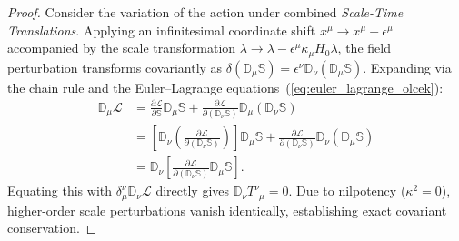 \documentclass[11pt,a4paper]{article}
\begin{document}
\begin{proof}
    Consider the variation of the action under combined \textit{Scale-Time Translations}. Applying an infinitesimal coordinate shift $x^\mu \to x^\mu + \epsilon^\mu$ accompanied by the scale transformation $\lambda \to \lambda - \epsilon^\mu \kappa_\mu H_0 \lambda$, the field perturbation transforms covariantly as $\delta (\mathbb{D}_\mu \mathbb{S}) = \epsilon^\nu \mathbb{D}_\nu (\mathbb{D}_\mu \mathbb{S})$. Expanding via the chain rule and the Euler--Lagrange equations~(\ref{eq:euler_lagrange_olcek}):
    \begin{align*}
        \mathbb{D}_\mu \mathcal{L} & = \frac{\partial \mathcal{L}}{\partial \mathbb{S}} \mathbb{D}_\mu \mathbb{S} + \frac{\partial \mathcal{L}}{\partial (\mathbb{D}_\nu \mathbb{S})} \mathbb{D}_\mu (\mathbb{D}_\nu \mathbb{S})                                                               \\
                                    & = \left[ \mathbb{D}_\nu \left( \frac{\partial \mathcal{L}}{\partial (\mathbb{D}_\nu \mathbb{S})} \right) \right] \mathbb{D}_\mu \mathbb{S} + \frac{\partial \mathcal{L}}{\partial (\mathbb{D}_\nu \mathbb{S})} \mathbb{D}_\nu (\mathbb{D}_\mu \mathbb{S}) \\
                                    & = \mathbb{D}_\nu \left[ \frac{\partial \mathcal{L}}{\partial (\mathbb{D}_\nu \mathbb{S})} \mathbb{D}_\mu \mathbb{S} \right].
    \end{align*}
    Equating this with $\delta^\nu_\mu \mathbb{D}_\nu \mathcal{L}$ directly gives $\mathbb{D}_\nu T^\nu_{\phantom{\nu}\mu} = 0$. Due to nilpotency ($\kappa^2 = 0$), higher-order scale perturbations vanish identically, establishing exact covariant conservation.
\end{proof}
\end{document}
